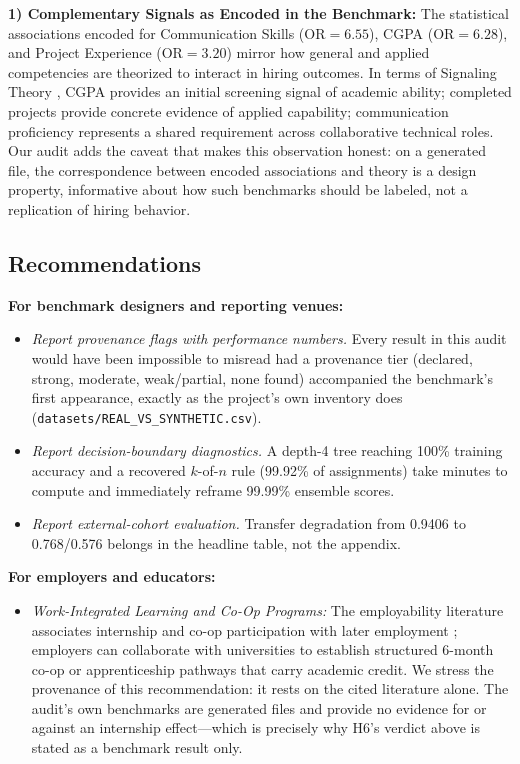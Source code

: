 \documentclass[journal]{IEEEtran}
\begin{document}
\textbf{1) Complementary Signals as Encoded in the Benchmark:} The statistical associations encoded for Communication Skills ($\text{OR} = 6.55$), CGPA ($\text{OR} = 6.28$), and Project Experience ($\text{OR} = 3.20$) mirror how general and applied competencies are theorized to interact in hiring outcomes. In terms of Signaling Theory \cite{spence1973job}, CGPA provides an initial screening signal of academic ability; completed projects provide concrete evidence of applied capability; communication proficiency represents a shared requirement across collaborative technical roles. Our audit adds the caveat that makes this observation honest: on a generated file, the correspondence between encoded associations and theory is a design property, informative about how such benchmarks should be labeled, not a replication of hiring behavior.

\subsection{Recommendations}

\textbf{For benchmark designers and reporting venues:}
\begin{itemize}
    \item \textit{Report provenance flags with performance numbers.} Every result in this audit would have been impossible to misread had a provenance tier (declared, strong, moderate, weak/partial, none found) accompanied the benchmark's first appearance, exactly as the project's own inventory does (\texttt{datasets/REAL\_VS\_SYNTHETIC.csv}).
    \item \textit{Report decision-boundary diagnostics.} A depth-4 tree reaching 100\% training accuracy and a recovered $k$-of-$n$ rule (99.92\% of assignments) take minutes to compute and immediately reframe 99.99\% ensemble scores.
    \item \textit{Report external-cohort evaluation.} Transfer degradation from 0.9406 to 0.768/0.576 belongs in the headline table, not the appendix.
\end{itemize}

\textbf{For employers and educators:}
\begin{itemize}
    \item \textit{Work-Integrated Learning and Co-Op Programs:} The employability literature associates internship and co-op participation with later employment \cite{pianda2024impact, scandurra2024employability}; employers can collaborate with universities to establish structured 6-month co-op or apprenticeship pathways that carry academic credit. We stress the provenance of this recommendation: it rests on the cited literature alone. The audit's own benchmarks are generated files and provide no evidence for or against an internship effect---which is precisely why H6's verdict above is stated as a benchmark result only.
\end{itemize}
\end{document}
